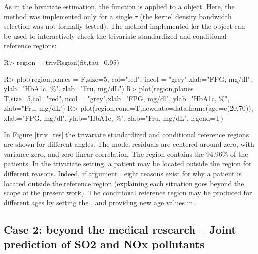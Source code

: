 

As in the bivariate estimation, the  function is applied to a  object. Here, the method was implemented only for a single $\tau$ (the kernel density bandwidth selection was not formally tested). The  method implemented for the  object can be used to interactively check the trivariate standardized and conditional reference regions:


\begin{example}
R> region = trivRegion(fit,tau=0.95)
	
R> plot(region,planes = F,size=5, col="red", incol = "grey",xlab="FPG, mg/dl", 
   ylab="HbA1c, \%", zlab="Fru, mg/dL")
R> plot(region,planes = T,size=5,col="red",incol = "grey",xlab="FPG, mg/dl",
   ylab="HbA1c, \%", zlab="Fru, mg/dL")
R> plot(region,cond=T,newdata=data.frame(age=c(20,70)), xlab="FPG, mg/dl",
   ylab="HbA1c, \%", zlab="Fru, mg/dL", legend=T)
\end{example}

In Figure \ref{triv_res} the trivariate standardized and conditional reference regions are shown for different angles. The model residuals are centered around zero, with variance zero, and zero linear correlation. The region contains the 94.96\% of the patients. In the trivariate setting, a patient may be located outside the region for different reasons. Indeed, if  argument , eight reasons exist for why a patient is located outside the reference region (explaining each situation goes beyond the scope of the present work). The conditional reference region may be produced for different ages by setting the , and providing new age values in .

\subsection{Case 2: beyond the medical research – Joint prediction of SO2 and NOx pollutants}

